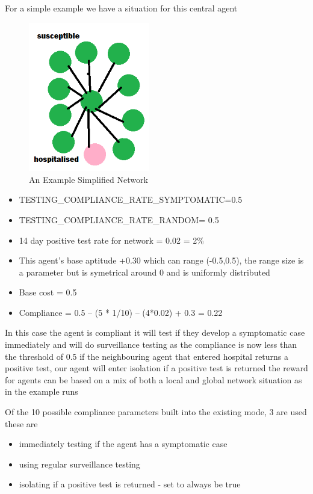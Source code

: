 \documentclass{article}
\begin{document}
For a simple example we have a situation for this central agent 

\begin{figure}
  \centering
      \includegraphics[width =150pt]{basicnet}
  \caption{An Example Simplified Network}
\end{figure}




\begin{itemize}
\item TESTING\_COMPLIANCE\_RATE\_SYMPTOMATIC=0.5 
\item TESTING\_COMPLIANCE\_RATE\_RANDOM= 0.5
\item 14 day positive test rate for network = 0.02 = 2\%
\item This agent’s base aptitude +0.30 which can range (-0.5,0.5), the range size is a parameter but is symetrical around 0 and is uniformly distributed 
\item Base cost = 0.5
\item Compliance = 0.5 – (5 * 1/10) – (4*0.02) + 0.3 = 0.22
\end{itemize}


In this case the agent is compliant
it will test if they develop a symptomatic case immediately and will do surveillance testing as the compliance is now less than the threshold of 0.5
if the neighbouring agent that entered hospital returns a positive test, our agent will enter isolation if a positive test is returned 
the reward for agents can be based on a mix of both a local and global network situation as in the example runs

Of the 10 possible compliance parameters built into the existing mode, 3 are used these are
\begin{itemize}
\item immediately testing if the agent has a symptomatic case
\item using regular surveillance testing
\item isolating if a positive test is returned - set to always be true
\end{itemize}
\end{document}
